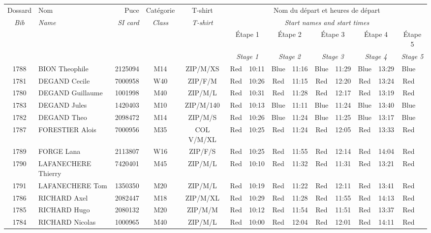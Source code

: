 \documentclass{report}
\begin{document}
  \begin{longtable}{|c|l|r|c|c|*{5}{cc|}}
    Dossard & Nom  & Puce    & Catégorie & T-shirt & \multicolumn{10}{c|}{Nom du départ et heures de départ} \\
    \itshape Bib     & \itshape Name & \itshape SI card & \itshape Class  & \itshape  T-shirt  & \multicolumn{10}{c|}{\itshape Start names and start times} \\
    \hline
    & & & & & \multicolumn{2}{c|}{Étape 1} & \multicolumn{2}{c|}{Étape 2} & \multicolumn{2}{c|}{Étape 3} & \multicolumn{2}{c|}{Étape 4} & \multicolumn{2}{c|}{Étape 5} \\
    & & & & & \multicolumn{2}{c|}{\itshape Stage 1} & \multicolumn{2}{c|}{\itshape Stage 2} & \multicolumn{2}{c|}{\itshape Stage 3} & \multicolumn{2}{c|}{\itshape Stage 4} & \multicolumn{2}{c|}{\itshape Stage 5} \\
    \hline
    1788 & BION Theophile & 2125094 & M14 & ZIP/M/XS & Red & 10:11 & Blue & 11:16 & Blue & 11:29 & Blue & 13:29 & Blue &  \\
    1781 & DEGAND Cecile & 7000958 & W40 & ZIP/F/M & Red & 10:26 & Red & 11:15 & Red & 12:20 & Red & 13:24 & Red &  \\
    1780 & DEGAND Guillaume & 1001998 & M40 & ZIP/M/L & Red & 10:31 & Red & 11:28 & Red & 12:17 & Red & 13:19 & Red &  \\
    1783 & DEGAND Jules & 1420403 & M10 & ZIP/M/140 & Red & 10:13 & Blue & 11:11 & Blue & 11:24 & Blue & 13:40 & Blue &  \\
    1782 & DEGAND Theo & 2098472 & M14 & ZIP/M/S & Red & 10:26 & Blue & 11:24 & Blue & 11:25 & Blue & 13:17 & Blue &  \\
    1787 & FORESTIER Alois & 7000956 & M35 & COL V/M/XL & Red & 10:25 & Red & 11:24 & Red & 12:05 & Red & 13:33 & Red &  \\
    1789 & FORGE Lana & 2113807 & W16 & ZIP/F/S & Red & 10:25 & Red & 11:55 & Red & 12:14 & Red & 14:04 & Red &  \\
    1790 & LAFANECHERE Thierry & 7420401 & M45 & ZIP/M/L & Red & 10:10 & Red & 11:32 & Red & 11:31 & Red & 13:21 & Red &  \\
    1791 & LAFANECHERE Tom & 1350350 & M20 & ZIP/M/L & Red & 10:19 & Red & 11:22 & Red & 12:11 & Red & 13:41 & Red &  \\
    1786 & RICHARD Axel & 2082447 & M18 & ZIP/M/XL & Red & 10:29 & Red & 11:28 & Red & 11:55 & Red & 14:13 & Red &  \\
    1785 & RICHARD Hugo & 2080132 & M20 & ZIP/M/M & Red & 10:12 & Red & 11:54 & Red & 11:51 & Red & 13:37 & Red &  \\
    1784 & RICHARD Nicolas & 1000965 & M40 & ZIP/M/L & Red & 10:00 & Red & 12:04 & Red & 12:01 & Red & 14:11 & Red &  \\
  \end{longtable}
\end{document}
